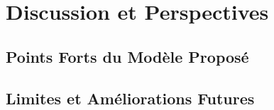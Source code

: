 \chapter{Discussion et Perspectives}
\label{chap:discussion}

\section{Points Forts du Modèle Proposé}
\label{sec:points_forts}


\section{Limites et Améliorations Futures}
\label{sec:limites}

